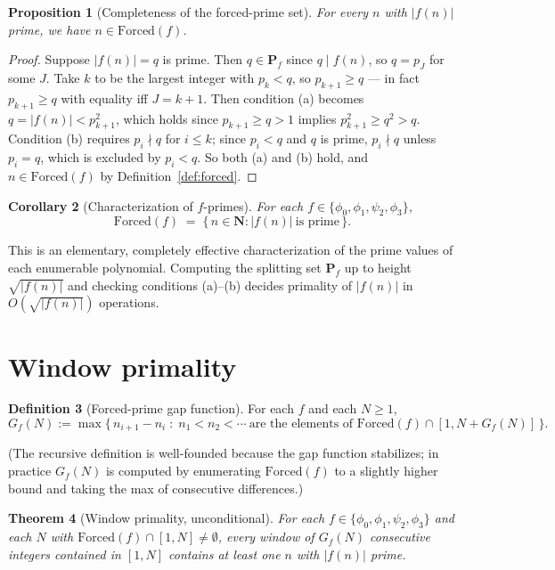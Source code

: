 \documentclass[11pt]{article}
\newtheorem{theorem}{Theorem}[section]
\newtheorem{proposition}[theorem]{Proposition}
\newtheorem{corollary}[theorem]{Corollary}
\theoremstyle{definition}
\newtheorem{definition}[theorem]{Definition}
\newcommand{\N}{\mathbf{N}}
\newcommand{\PP}{\mathbf{P}}
\newcommand{\Forced}{\mathrm{Forced}}
\begin{document}
\begin{proposition}[Completeness of the forced-prime set]\label{prop:completeness}
For every $n$ with $|f(n)|$ prime, we have $n \in \Forced(f)$.
\end{proposition}

\begin{proof}
Suppose $|f(n)| = q$ is prime. Then $q \in \PP_f$ since $q \mid f(n)$, so $q = p_J$ for some $J$. Take $k$ to be the largest integer with $p_k < q$, so $p_{k+1} \ge q$ — in fact $p_{k+1} \ge q$ with equality iff $J = k+1$. Then condition (a) becomes $q = |f(n)| < p_{k+1}^2$, which holds since $p_{k+1} \ge q > 1$ implies $p_{k+1}^2 \ge q^2 > q$. Condition (b) requires $p_i \nmid q$ for $i \le k$; since $p_i < q$ and $q$ is prime, $p_i \nmid q$ unless $p_i = q$, which is excluded by $p_i < q$. So both (a) and (b) hold, and $n \in \Forced(f)$ by Definition~\ref{def:forced}.
\end{proof}

\begin{corollary}[Characterization of $f$-primes]\label{cor:characterization}
For each $f \in \{\phi_0,\phi_1,\psi_2,\phi_3\}$,
\[
\Forced(f) \;=\; \{\,n \in \N : |f(n)|\ \text{is prime}\,\}.
\]
\end{corollary}

This is an elementary, completely effective characterization of the prime values of each enumerable polynomial. Computing the splitting set $\PP_f$ up to height $\sqrt{|f(n)|}$ and checking conditions (a)–(b) decides primality of $|f(n)|$ in $O(\sqrt{|f(n)|})$ operations.

\section{Window primality}\label{sec:window}

\begin{definition}[Forced-prime gap function]\label{def:gap}
For each $f$ and each $N \ge 1$,
\[
G_f(N) := \max\{\,n_{i+1} - n_i \;:\; n_1 < n_2 < \cdots\ \text{are the elements of } \Forced(f) \cap [1,N+G_f(N)]\,\}.
\]
\end{definition}

(The recursive definition is well-founded because the gap function stabilizes; in practice $G_f(N)$ is computed by enumerating $\Forced(f)$ to a slightly higher bound and taking the max of consecutive differences.)

\begin{theorem}[Window primality, unconditional]\label{thm:window}
For each $f \in \{\phi_0, \phi_1, \psi_2, \phi_3\}$ and each $N$ with $\Forced(f) \cap [1, N] \ne \emptyset$, every window of $G_f(N)$ consecutive integers contained in $[1, N]$ contains at least one $n$ with $|f(n)|$ prime.
\end{theorem}
\end{document}
